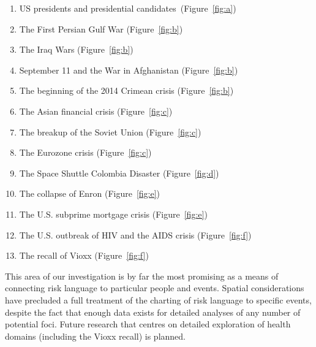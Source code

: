                 \begin{enumerate} \setlength\itemsep{0em}
                    \item US presidents and presidential candidates~(Figure~\ref{fig:a})
                    \item The First Persian Gulf War (Figure~\ref{fig:b})                   
                    \item The Iraq Wars (Figure~\ref{fig:b})
                    \item September 11 and the War in Afghanistan (Figure~\ref{fig:b})   
                    \item The beginning of the 2014 Crimean crisis (Figure~\ref{fig:b})       
                    \item The Asian financial crisis (Figure~\ref{fig:c})
                    \item The breakup of the Soviet Union (Figure~\ref{fig:c})
                    \item The Eurozone crisis (Figure~\ref{fig:c})
                    \item The Space Shuttle Colombia Disaster (Figure~\ref{fig:d})
                    \item The collapse of Enron (Figure~\ref{fig:e})
                    \item The U.S. subprime mortgage crisis  (Figure~\ref{fig:e})
                    \item The U.S. outbreak of HIV and the AIDS crisis (Figure~\ref{fig:f})
                    \item The recall of Vioxx (Figure~\ref{fig:f})
                \end{enumerate}
                This area of our investigation is by far the most promising as a means of connecting risk language to particular people and events. Spatial considerations have precluded a full treatment of the charting of risk language to specific events, despite the fact that enough data exists for detailed analyses of any number of potential foci. Future research that centres on detailed exploration of health domains (including the Vioxx recall) is planned.


